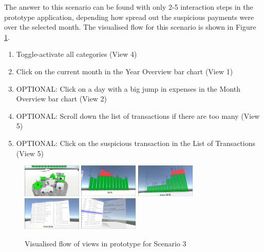 The answer to this scenario can be found with only 2-5 interaction steps in the prototype application, depending how spread out the suspicious payments were over the selected month. The visualised flow for this scenario is shown in Figure \ref{fig:scenariothreeprototype}.
\begin{enumerate}
	\item Toggle-activate all categories (View 4)
	\item Click on the current month in the Year Overview bar chart (View 1)
	\item OPTIONAL: Click on a day with a big jump in expenses in the Month Overview bar chart (View 2)
	\item OPTIONAL: Scroll down the list of transactions if there are too many (View 5)
	\item OPTIONAL: Click on the suspicious transaction in the List of Transactions (View 5)
\end{enumerate}
\begin{figure}[h]
	\begin{center}
		\includegraphics[width=2.8cm]{03_Figures/08_Development/View4_CategoriesFiltering.png}
		\includegraphics[width=2.8cm]{03_Figures/08_Development/View1_YearOverview.png}
		\includegraphics[width=2.8cm]{03_Figures/08_Development/View2_MonthOverview.png}
		\includegraphics[width=2.8cm]{03_Figures/08_Development/View5_FinTransactionsOverview.png}
		\includegraphics[width=2.8cm]{03_Figures/08_Development/View6_FinTransactionDetails.png}
		\caption{Visualised flow of views in prototype for Scenario 3}
		\label{fig:scenariothreeprototype}
	\end{center}
\end{figure}

